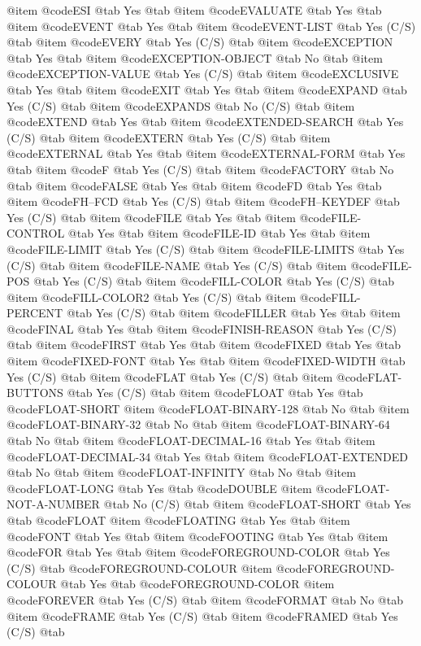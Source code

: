 @item @code{ESI} @tab Yes @tab 
@item @code{EVALUATE} @tab Yes @tab 
@item @code{EVENT} @tab Yes @tab 
@item @code{EVENT-LIST} @tab Yes	(C/S) @tab 
@item @code{EVERY} @tab Yes	(C/S) @tab 
@item @code{EXCEPTION} @tab Yes @tab 
@item @code{EXCEPTION-OBJECT} @tab No @tab 
@item @code{EXCEPTION-VALUE} @tab Yes	(C/S) @tab 
@item @code{EXCLUSIVE} @tab Yes @tab 
@item @code{EXIT} @tab Yes @tab 
@item @code{EXPAND} @tab Yes	(C/S) @tab 
@item @code{EXPANDS} @tab No	(C/S) @tab 
@item @code{EXTEND} @tab Yes @tab 
@item @code{EXTENDED-SEARCH} @tab Yes	(C/S) @tab 
@item @code{EXTERN} @tab Yes	(C/S) @tab 
@item @code{EXTERNAL} @tab Yes @tab 
@item @code{EXTERNAL-FORM} @tab Yes @tab 
@item @code{F} @tab Yes	(C/S) @tab 
@item @code{FACTORY} @tab No @tab 
@item @code{FALSE} @tab Yes @tab 
@item @code{FD} @tab Yes @tab 
@item @code{FH--FCD} @tab Yes	(C/S) @tab 
@item @code{FH--KEYDEF} @tab Yes	(C/S) @tab 
@item @code{FILE} @tab Yes @tab 
@item @code{FILE-CONTROL} @tab Yes @tab 
@item @code{FILE-ID} @tab Yes @tab 
@item @code{FILE-LIMIT} @tab Yes	(C/S) @tab 
@item @code{FILE-LIMITS} @tab Yes	(C/S) @tab 
@item @code{FILE-NAME} @tab Yes	(C/S) @tab 
@item @code{FILE-POS} @tab Yes	(C/S) @tab 
@item @code{FILL-COLOR} @tab Yes	(C/S) @tab 
@item @code{FILL-COLOR2} @tab Yes	(C/S) @tab 
@item @code{FILL-PERCENT} @tab Yes	(C/S) @tab 
@item @code{FILLER} @tab Yes @tab 
@item @code{FINAL} @tab Yes @tab 
@item @code{FINISH-REASON} @tab Yes	(C/S) @tab 
@item @code{FIRST} @tab Yes @tab 
@item @code{FIXED} @tab Yes @tab 
@item @code{FIXED-FONT} @tab Yes @tab 
@item @code{FIXED-WIDTH} @tab Yes	(C/S) @tab 
@item @code{FLAT} @tab Yes	(C/S) @tab 
@item @code{FLAT-BUTTONS} @tab Yes	(C/S) @tab 
@item @code{FLOAT} @tab Yes @tab @code{FLOAT-SHORT}
@item @code{FLOAT-BINARY-128} @tab No @tab 
@item @code{FLOAT-BINARY-32} @tab No @tab 
@item @code{FLOAT-BINARY-64} @tab No @tab 
@item @code{FLOAT-DECIMAL-16} @tab Yes @tab 
@item @code{FLOAT-DECIMAL-34} @tab Yes @tab 
@item @code{FLOAT-EXTENDED} @tab No @tab 
@item @code{FLOAT-INFINITY} @tab No @tab 
@item @code{FLOAT-LONG} @tab Yes @tab @code{DOUBLE}
@item @code{FLOAT-NOT-A-NUMBER} @tab No	(C/S) @tab 
@item @code{FLOAT-SHORT} @tab Yes @tab @code{FLOAT}
@item @code{FLOATING} @tab Yes @tab 
@item @code{FONT} @tab Yes @tab 
@item @code{FOOTING} @tab Yes @tab 
@item @code{FOR} @tab Yes @tab 
@item @code{FOREGROUND-COLOR} @tab Yes	(C/S) @tab @code{FOREGROUND-COLOUR}
@item @code{FOREGROUND-COLOUR} @tab Yes @tab @code{FOREGROUND-COLOR}
@item @code{FOREVER} @tab Yes	(C/S) @tab 
@item @code{FORMAT} @tab No @tab 
@item @code{FRAME} @tab Yes	(C/S) @tab 
@item @code{FRAMED} @tab Yes	(C/S) @tab 
